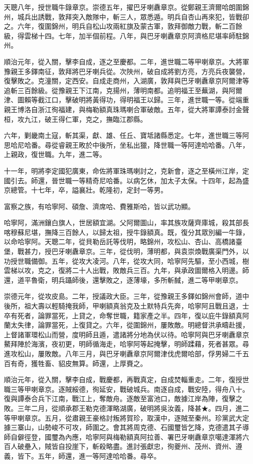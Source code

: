 \begin{pinyinscope}
天聰八年，授世職牛錄章京。崇德五年，擢巴牙喇纛章京。從鄭親王濟爾哈朗圍錦州，城兵出誘戰，敦拜突入敵隊中，斬三人，眾悉遁。明兵自杏山再來犯，皆戰卻之。六年，復圍錦州，明兵自松山攻兩紅旗及蒙古軍，敦拜御敵力戰，斬二百餘級，得雲梯十四。七年，加半個前程。八年，與巴牙喇纛章京阿濟格尼堪率師駐錦州。

順治元年，從入關，擊李自成，逐之至慶都。二年，進世職二等甲喇章京。大將軍豫親王多鐸南征，敦拜將巴牙喇兵從。次陜州，破自成將劉方亮，方亮兵夜襲營，復擊敗之。克潼關，定西安。自成走商州，入湖廣，敦拜與巴牙喇纛章京阿爾津等追斬三百餘級。從豫親王下江南，克揚州，薄明南都。追明福王至蕪湖，與阿爾津、圖賴等截江口，擊破明將黃得功，得明福王以歸。三年，進世職一等。從端重親王博洛自浙江徇福建，與梅勒額真珠瑪喇合軍破敵。五年，從大將軍譚泰討金聲桓，攻九江，破王得仁軍，克之，撫臨江郡縣。

六年，剿畿南土寇，斬其渠，獻、雄、任丘、寶坻諸縣悉定。七年，進世職三等阿思哈尼哈番。尋從睿親王畋於中後所，坐私出獵，降世職一等阿達哈哈番。八年，上親政，復世職。九年，進二等。

十一年，明將李定國犯廣東，命佐將軍珠瑪喇討之，克新會，逐之至橫州江岸，定國引去。師還，晉世職一等精奇尼哈番。以病乞休，加太子太保。十四年，起為盛京總管。十七年，卒，謚襄壯。乾隆初，定封一等男。

富察之族，有哈寧阿、碩詹、濟席哈、費雅斯哈，皆以武功顯。

哈寧阿，滿洲鑲白旗人，世居額宜湖。父阿爾圖山，率其族攻薩齊庫城，殺其部長喀穆蘇尼堪，撫降三百餘人，以歸太祖，授牛錄額真。既，復分其眾別編一牛錄，以命哈寧阿。天聰二年，從貝勒岳託等伐明，略錦州，攻松山、杏山、高橋諸臺堡，戰甚力，授巴牙喇纛章京。三年，從伐明，薄明都，與袁崇煥戰廣渠門外，以功授世職備御。五年，從攻大凌河。八年，從攻大同，哈寧阿先驅，至小西城，樹雲梯以攻，克之，復將二十人出戰，敗敵兵三百。九年，與承政圖爾格入明邊。師還，道平魯衛，明兵躡師後，還擊敗之，逐薄壕，多所斬馘，進二等甲喇章京。

崇德元年，從攻皮島。二年，授議政大臣。三年，從豫親王多鐸如錦州會師，道中後所，祖大壽以輕騎掩我師，甲喇額真翁克及土默特兵先奔，哈寧阿且戰且退，士卒有死者，論罪當死，上貸之，命奪世職，籍家產之半。四年，復以庇牛錄額真阿蘭太失律，論罪當死，上復貸之。六年，從圍錦州，屢敗敵。明總督洪承疇赴援，上督諸軍環松山而營，度明師且遁，遣諸將分地為伏以待。哈寧阿與巴牙喇纛章京鰲拜陣於海濱，夜初更，明師循海走，哈寧阿等起掩擊，明師蹂藉，死者甚眾。尋進攻松山，屢敗敵。八年三月，與巴牙喇纛章京阿爾津伐虎爾哈部，俘男婦二千五百有奇，獲牲畜、貂皮無算。師還，上厚賚之。

順治元年，從入關，擊李自成，戰慶都，再戰真定，自成焚輜重走。二年，復授世職三等甲喇章京。逐賊綏德，徇延安，戰破城兵。南逐自成，戰安陸，得舟八十。復與譚泰合兵下江南，戰江上，奪敵舟。逐敵至富池口，敵據江岸為陣，復擊之敗。三年二月，從順承郡王勒克德渾略湖廣，破明將吳汝義，降甚★。四月，進二等甲喇章京。五月，從肅親王豪格討叛將賀珍，取漢中，逐賊至秦州。珍黨武大定據三寨山，山勢峻不可攻，師圍之。會其將周克德、石國璽皆乞降，克德遣其子導師自僻徑登，國璽為內應，哈寧阿與梅勒額真阿拉善、署巴牙喇纛章京噶達渾將六百人破壘入，賊皆自投崖下，斬殺略盡。進討張獻忠，徇夔州、茂州、資州、遵義，皆下。五年，師還，進一等阿達哈哈番。尋卒。


\end{pinyinscope}
